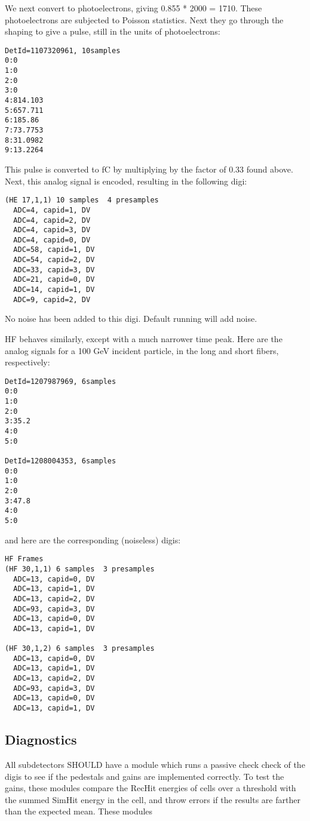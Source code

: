 \documentclass{cmspaper}
\begin{document}
We next convert to photoelectrons, giving 0.855 * 2000 = 1710.
These photoelectrons are subjected to Poisson statistics.
Next they go through the shaping to give a pulse, still in the units
of photoelectrons:

\begin{verbatim}
DetId=1107320961, 10samples
0:0
1:0
2:0
3:0
4:814.103
5:657.711
6:185.86
7:73.7753
8:31.0982
9:13.2264
\end{verbatim}

This pulse is converted to fC by multiplying by the
factor of 0.33 found above.  Next, this analog signal
is encoded, resulting in the following digi:

\begin{verbatim}
(HE 17,1,1) 10 samples  4 presamples
  ADC=4, capid=1, DV
  ADC=4, capid=2, DV
  ADC=4, capid=3, DV
  ADC=4, capid=0, DV
  ADC=58, capid=1, DV
  ADC=54, capid=2, DV
  ADC=33, capid=3, DV
  ADC=21, capid=0, DV
  ADC=14, capid=1, DV
  ADC=9, capid=2, DV
\end{verbatim}

No noise has been added to this digi.  Default running will add noise.

HF behaves similarly, except with a much narrower time peak.
Here are the analog signals for a 100 GeV incident particle,
in the long and short fibers, respectively:

\begin{verbatim}
DetId=1207987969, 6samples
0:0
1:0
2:0
3:35.2
4:0
5:0

DetId=1208004353, 6samples
0:0
1:0
2:0
3:47.8
4:0
5:0
\end{verbatim}

and here are the corresponding (noiseless) digis:

\begin{verbatim}
HF Frames
(HF 30,1,1) 6 samples  3 presamples
  ADC=13, capid=0, DV
  ADC=13, capid=1, DV
  ADC=13, capid=2, DV
  ADC=93, capid=3, DV
  ADC=13, capid=0, DV
  ADC=13, capid=1, DV

(HF 30,1,2) 6 samples  3 presamples
  ADC=13, capid=0, DV
  ADC=13, capid=1, DV
  ADC=13, capid=2, DV
  ADC=93, capid=3, DV
  ADC=13, capid=0, DV
  ADC=13, capid=1, DV
\end{verbatim}

\subsection{Diagnostics}

All subdetectors SHOULD have a module which runs a passive check
check of the digis to see if the pedestals and gains
are implemented correctly.  To test the gains,
these modules compare
the RecHit energies of cells over a threshold
with the summed SimHit energy in the cell, and 
throw errors if the results are farther than
the expected mean.  These modules 
\end{document}
